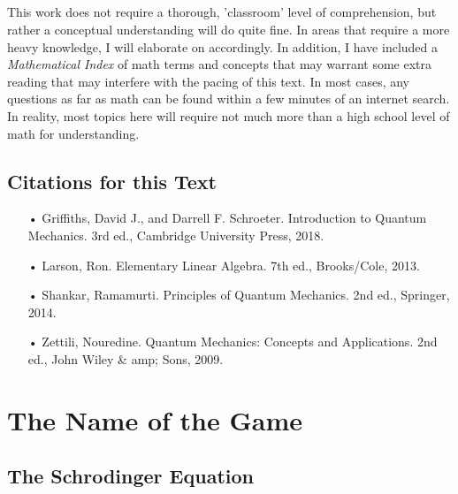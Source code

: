 \documentclass[12pt,letterpaper]{book}
\begin{document}
\paragraph*{}This work does not require a thorough, 'classroom' level of comprehension, but rather a conceptual understanding will do quite fine. In areas that require a more heavy knowledge, I will elaborate on accordingly. In addition, I have included a \textit{Mathematical Index} of math terms and concepts that may warrant some extra reading that may interfere with the pacing of this text. In most cases, any questions as far as math can be found within a few minutes of an internet search. In reality, most topics here will require not much more than a high school level of math for understanding. 


\section*{Citations for this Text}
\begin{itemize}
\item[•]Griffiths, David J., and Darrell F. Schroeter. Introduction to Quantum Mechanics. 3rd ed., Cambridge University Press, 2018.
\item[•]Larson, Ron. Elementary Linear Algebra. 7th ed., Brooks/Cole, 2013.
\item[•]Shankar, Ramamurti. Principles of Quantum Mechanics. 2nd ed., Springer, 2014.
\item[•]Zettili, Nouredine. Quantum Mechanics: Concepts and Applications. 2nd ed., John Wiley \& amp; Sons, 2009.
\end{itemize}

\vspace{16cm}
\pagebreak


\chapter{The Name of the Game}


\section{The Schrodinger Equation}
\end{document}

